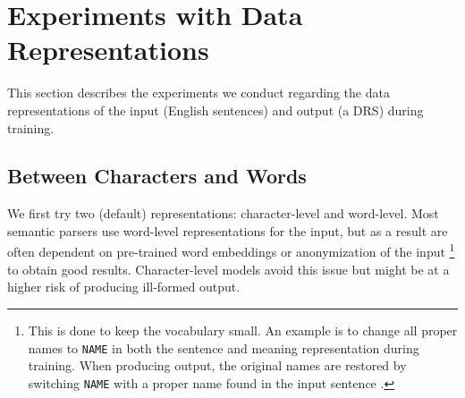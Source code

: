 \documentclass[11pt,a4paper]{article}
\begin{document}
\begin{table}[t]
\centering
{}
\caption{Parameters explored during training and testing with their final values. All other parameters have default values.}
\label{tab:param}
\end{table}

\section{Experiments with Data Representations}
\label{sec:rep_exp}

This section describes the experiments we conduct regarding the data representations of the input (English sentences) and output (a DRS) during training.

\subsection{Between Characters and Words}

We first try two (default) representations: character-level and word-level. Most semantic parsers use word-level representations for the input, but as a result are often dependent on pre-trained word embeddings or anonymization of the input
\footnote{This is done to keep the vocabulary small. An example is to change all proper names to \texttt{NAME} in both the sentence and meaning representation during training. When producing output, the original names are restored by switching \texttt{NAME} with a proper name found in the input sentence \cite{konstas:17}.}
to obtain good results. Character-level models avoid this issue but might be at a higher risk of producing ill-formed output.
\end{document}
